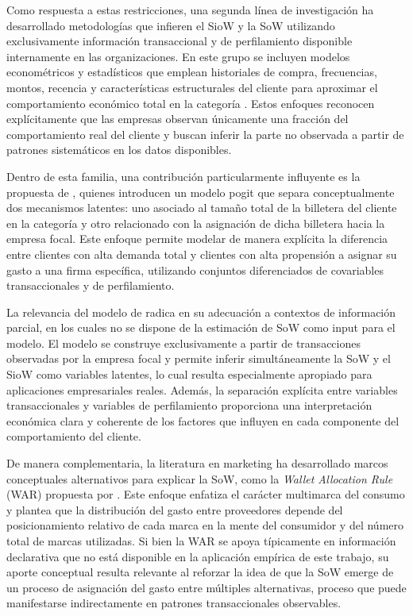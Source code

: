 Como respuesta a estas restricciones, una segunda línea de investigación ha desarrollado metodologías que infieren el SioW y la SoW utilizando exclusivamente información transaccional y de perfilamiento disponible internamente en las organizaciones. En este grupo se incluyen modelos econométricos y estadísticos que emplean historiales de compra, frecuencias, montos, recencia y características estructurales del cliente para aproximar el comportamiento económico total en la categoría \cite{du2007size}. Estos enfoques reconocen explícitamente que las empresas observan únicamente una fracción del comportamiento real del cliente y buscan inferir la parte no observada a partir de patrones sistemáticos en los datos disponibles.

Dentro de esta familia, una contribución particularmente influyente es la propuesta de \cite{glady2009predicting}, quienes introducen un modelo pogit que separa conceptualmente dos mecanismos latentes: uno asociado al tamaño total de la billetera del cliente en la categoría y otro relacionado con la asignación de dicha billetera hacia la empresa focal. Este enfoque permite modelar de manera explícita la diferencia entre clientes con alta demanda total y clientes con alta propensión a asignar su gasto a una firma específica, utilizando conjuntos diferenciados de covariables transaccionales y de perfilamiento.

La relevancia del modelo de \cite{glady2009predicting} radica en su adecuación a contextos de información parcial, en los cuales no se dispone de la estimación de SoW como input para el modelo. El modelo se construye exclusivamente a partir de transacciones observadas por la empresa focal y permite inferir simultáneamente la SoW y el SioW como variables latentes, lo cual resulta especialmente apropiado para aplicaciones empresariales reales. Además, la separación explícita entre variables transaccionales y variables de perfilamiento proporciona una interpretación económica clara y coherente de los factores que influyen en cada componente del comportamiento del cliente.

De manera complementaria, la literatura en marketing ha desarrollado marcos conceptuales alternativos para explicar la SoW, como la \emph{Wallet Allocation Rule} (WAR) propuesta por \cite{keiningham2015wallet}. Este enfoque enfatiza el carácter multimarca del consumo y plantea que la distribución del gasto entre proveedores depende del posicionamiento relativo de cada marca en la mente del consumidor y del número total de marcas utilizadas. Si bien la WAR se apoya típicamente en información declarativa que no está disponible en la aplicación empírica de este trabajo, su aporte conceptual resulta relevante al reforzar la idea de que la SoW emerge de un proceso de asignación del gasto entre múltiples alternativas, proceso que puede manifestarse indirectamente en patrones transaccionales observables.

